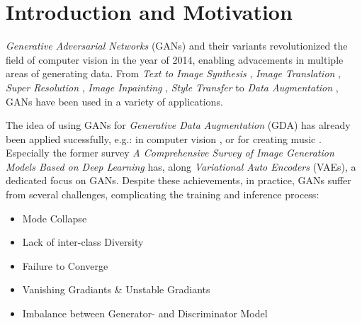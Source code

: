 \section{Introduction and Motivation}\label{introduction_and_motivation}
\pagestyle{fancy}
\textit{Generative Adversarial Networks} (GANs) \cite{goodfellow2014generativeadversarialnetworks} and their variants revolutionized the field of computer vision in the year of 2014, enabling advacements in multiple areas of generating data. From \textit{Text to Image Synthesis} \cite{reed2016generativeadversarialtextimage}, \textit{Image Translation} \cite{isola2018imagetoimagetranslationconditionaladversarial}, \textit{Super Resolution} \cite{ledig2017photorealisticsingleimagesuperresolution}, \textit{Image Inpainting} \cite{pathak2016contextencodersfeaturelearning}, \textit{Style Transfer} \cite{wang2023multimodalityguidedimagestyletransfer} to \textit{Data Augmentation} \cite{shorten2019survey}, GANs have been used in a variety of applications.

The idea of using GANs for \textit{Generative Data Augmentation} (GDA) has already been applied sucessfully, e.g.: in computer vision \cite{Li2025comprehensivesurvedeepimages}, \cite{biswas2023generativeadversarialnetworksdata} or for creating music \cite{ji2020comprehensivesurveydeepmusic}. Especially the former survey \textit{A Comprehensive Survey of Image Generation Models Based on Deep Learning} has, along \textit{Variational Auto Encoders} (VAEs), a dedicated focus on GANs. Despite these achievements, in practice, GANs suffer from several challenges, complicating the training and inference process:

\begin{itemize}\label{problems_of_gans}
    \setlength{\itemsep}{-5pt}
    \item Mode Collapse
    \item Lack of inter-class Diversity
    \item Failure to Converge
    \item Vanishing Gradiants \& Unstable Gradiants
    \item Imbalance between Generator- and Discriminator Model
\end{itemize}

